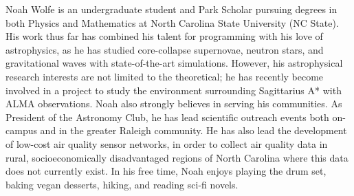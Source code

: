 
Noah Wolfe is an undergraduate student and Park Scholar pursuing degrees in both Physics and Mathematics at North Carolina State University (NC State). His work thus far has combined his talent for programming with his love of astrophysics, as he has studied core-collapse supernovae, neutron stars, and gravitational waves with state-of-the-art simulations. However, his astrophysical research interests are not limited to the theoretical; he has recently become involved in a project to study the environment surrounding Sagittarius A* with ALMA observations. Noah also strongly believes in serving his communities. As President of the Astronomy Club, he has lead scientific outreach events both on-campus and in the greater Raleigh community. He has also lead the development of low-cost air quality sensor networks, in order to collect air quality data in rural, socioeconomically disadvantaged regions of North Carolina where this data does not currently exist. In his free time, Noah enjoys playing the drum set, baking vegan desserts, hiking, and reading sci-fi novels. 